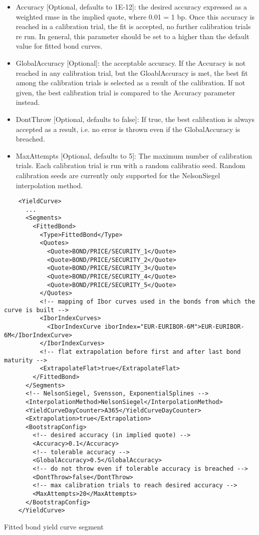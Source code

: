 \begin{itemize}
\item Accuracy [Optional, defaults to 1E-12]: the desired accuracy expressed as a weighted rmse in the implied quote,
  where 0.01 = 1 bp. Once this accuracy is reached in a calibration trial, the fit is accepted, no further calibration
  trials re run. In general, this parameter should be set to a higher than the default value for fitted bond curves.
\item GlobalAccuracy [Optional]: the acceptable accuracy. If the Accuracy is not reached in any calibration trial, but
  the GloablAccuracy is met, the best fit among the calibration trials is selected as a result of the calibration. If
  not given, the best calibration trial is compared to the Accuracy parameter instead.
\item DontThrow [Optional, defaults to false]: If true, the best calibration is always accepted as a result, i.e. no
  error is thrown even if the GlobalAccuracy is breached.
\item MaxAttempts [Optional, defaults to 5]: The maximum number of calibration trials. Each calibration trial is run with a random calibratio
  seed. Random calibration seeds are currently only supported for the NelsonSiegel interpolation method.
\end{itemize}

\begin{listing}[H]
\begin{verbatim}
    <YieldCurve>
      ...
      <Segments>
        <FittedBond>
          <Type>FittedBond</Type>
          <Quotes>
            <Quote>BOND/PRICE/SECURITY_1</Quote>
            <Quote>BOND/PRICE/SECURITY_2</Quote>
            <Quote>BOND/PRICE/SECURITY_3</Quote>
            <Quote>BOND/PRICE/SECURITY_4</Quote>
            <Quote>BOND/PRICE/SECURITY_5</Quote>
          </Quotes>
          <!-- mapping of Ibor curves used in the bonds from which the curve is built -->
          <IborIndexCurves>
            <IborIndexCurve iborIndex="EUR-EURIBOR-6M">EUR-EURIBOR-6M</IborIndexCurve>
          </IborIndexCurves>
          <!-- flat extrapolation before first and after last bond maturity -->
          <ExtrapolateFlat>true</ExtrapolateFlat>
        </FittedBond>
      </Segments>
      <!-- NelsonSiegel, Svensson, ExponentialSplines -->
      <InterpolationMethod>NelsonSiegel</InterpolationMethod>
      <YieldCurveDayCounter>A365</YieldCurveDayCounter>
      <Extrapolation>true</Extrapolation>
      <BootstrapConfig>
        <!-- desired accuracy (in implied quote) -->
        <Accuracy>0.1</Accuracy>
        <!-- tolerable accuracy -->
        <GlobalAccuracy>0.5</GlobalAccuracy>
        <!-- do not throw even if tolerable accuracy is breached -->
        <DontThrow>false</DontThrow>
        <!-- max calibration trials to reach desired accuracy -->
        <MaxAttempts>20</MaxAttempts>
      </BootstrapConfig>
    </YieldCurve>
\end{verbatim}
\caption{Fitted bond yield curve segment}
\label{lst:fitted_bond_segment}
\end{listing}

